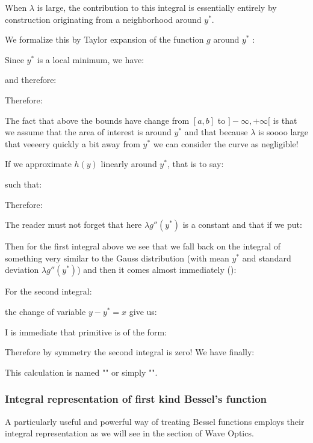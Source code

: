 \begin{enumerate}
		When $\lambda$ is large, the contribution to this integral is essentially entirely by construction originating from a neighborhood around $y^*$.
		
		We formalize this by Taylor expansion of the function $g$ around $y^*$ :
		
		Since $y^*$ is a local minimum, we have:
		
		 and therefore:
		
		Therefore:
		
		The fact that above the bounds have change from $[a,b]$ to $]-\infty,+\infty[$ is that we assume that the area of interest is around $y^*$ and that because $\lambda$ is soooo large that veeeery quickly a bit away from $y^*$ we can consider the curve as negligible!
		
		If we approximate $h(y)$ linearly around $y^*$, that is to say:
		
		such that:
		
		Therefore:
		
		The reader must not forget that here $\lambda g''(y^*)$ is a constant and that if we put:
		
		Then for the first integral above we see that we fall back on the integral of something very similar to the Gauss distribution (with mean $y^*$ and standard deviation $\lambda g''(y^*)$) and then it comes almost immediately ():
		
		For the second integral:
		
		the change of variable $y-y^*=x$ give us:
		
		I is immediate that primitive is of the form:
		
		Therefore by symmetry the second integral is zero! We have finally:
		
		This calculation is named "\label{laplace method of integration}" or simply "".
	\end{enumerate}
	
	\subsubsection{Integral representation of first kind Bessel's function}\label{integral representation of first kind Bessel's function}
	A particularly useful and powerful way of treating Bessel functions employs their integral representation as we will see in the section of Wave Optics.
	
